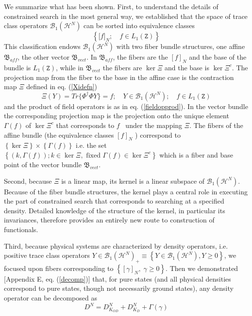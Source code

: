 \documentclass[aps,preprint]{revtex4}%
\begin{document}
We summarize what has been shown. First, to understand the details of
constrained search in the most general way, we established that the space of
trace class operators $\mathcal{B}_{1}(\mathcal{H}^{N})$ can be sorted into
equivalence classes
\begin{equation}
\left\{  \lbrack f]_{N};\quad f\in L_{1}(\mathtt{Z})\right\}
\label{summequiv}%
\end{equation}
This classification endows $\mathcal{B}_{1}(\mathcal{H}^{N})$ with two fiber
bundle structures, one affine $\mathfrak{B}_{aff}$, the other vector
$\mathfrak{B}_{vect}$. In $\mathfrak{B}_{aff}$, the fibers are the $[f]_{N}$
and the base of the bundle is $L_{1}(\mathtt{Z})$, while in $\mathfrak{B}%
_{vect}$ the fibers are $\ker\Xi$ and the base is $\ker\Xi^{c}$. The
projection map from the fiber to the base in the affine case is the
contraction map $\Xi$ defined in eq. (\ref{Xidefn})
\begin{equation}
\Xi(Y)=Tr\{\Phi^{\dagger}\Phi Y\}=f;\quad Y\in\mathcal{B}_{1}(\mathcal{H}%
^{N});\quad f\in L_{1}(\mathtt{Z}) \label{summXidefn}%
\end{equation}
and the product of field operators is as in eq. (\ref{fieldopprod}). In the
vector bundle the corresponding projection map is the projection onto the
unique element $\Gamma\left(  f\right)  $ of $\ker\Xi^{c}$ that corresponds to
$f$ \ under the mapping $\Xi$. The fibers of the affine bundle (the
equivalence classes $[f]_{N}$ ) correspond to $\left\{  \ker\Xi\right\}
\times\left\{  \Gamma\left(  f\right)  \right\}  $ i.e. the set $\left\{
\left(  k,\Gamma\left(  f\right)  \right)  ;k\in\ker\Xi,\text{ fixed }%
\Gamma\left(  f\right)  \in\ker\Xi^{c}\right\}  $ which is a fiber and base
point of the vector bundle $\mathfrak{B}_{vect}$.

Second, because $\Xi$ is a linear map, its kernel is a linear subspace of
$\mathcal{B}_{1}(\mathcal{H}^{N})$. Because of the fiber bundle structures,
the kernel plays a central role in executing the part of constrained search
that corresponds to searching at a specified density. Detailed knowledge of
the structure of the kernel, in particular its invariances, therefore provides
an entirely new route to construction of functionals.

Third, because physical systems are characterized by density operators, i.e.
positive trace class operators $Y\in\mathcal{B}_{1}(\mathcal{H}^{N})_{+}%
\equiv\left\{  Y\in\mathcal{B}_{1}(\mathcal{H}^{N}),Y\geq0\right\}  $, we
focused upon fibers corresponding to $\left\{  [\gamma]_{N},\;\gamma
\geq0\right\}  $. Then we demonstrated [Appendix E, eq. (\ref{decomp})] that,
for pure states (and all physical densities correspond to pure states, though
not necessarily ground states), any density operator can be decomposed as
\begin{equation}
D^{N}=D_{K_{OD}}^{N}+D_{K_{D}}^{N}+\Gamma\left(  \gamma\right)
\end{equation}
\end{document}
